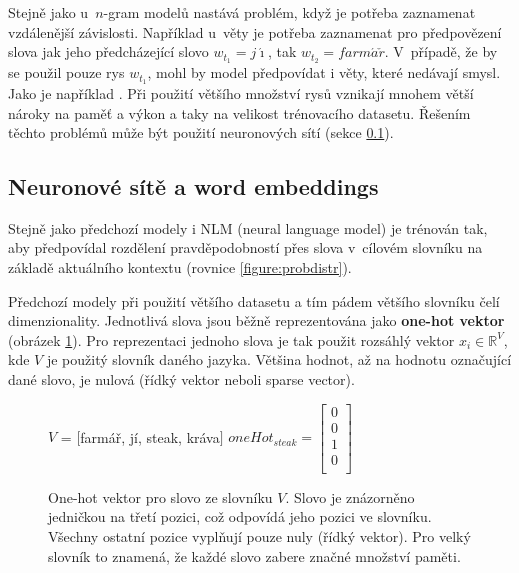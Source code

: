 Stejně jako u~$n$-gram modelů nastává problém, když je potřeba zaznamenat vzdálenější závislosti. Například u~věty  je potřeba zaznamenat pro předpovězení slova  jak jeho předcházející slovo $w_{t_1}=j\acute{\imath}$, tak $w_{t_2}=farm\acute{a}\check{r}$. V~případě, že by se použil pouze rys $w_{t_1}$, mohl by model předpovídat i věty, které nedávají smysl. Jako je například . Při použití většího množství rysů vznikají mnohem větší nároky na paměť a výkon a taky na velikost trénovacího datasetu. Řešením těchto problémů může být použití neuronových sítí (sekce \ref{subsection:neuralembeddings}).


\subsection{Neuronové sítě a word embeddings}\label{subsection:neuralembeddings}
Stejně jako předchozí modely i NLM (neural language model) je trénován tak, aby předpovídal rozdělení pravděpodobností přes slova v~cílovém slovníku na základě aktuálního kontextu (rovnice \ref{figure:probdistr}).

Předchozí modely při použití většího datasetu a tím pádem většího slovníku čelí  dimenzionality. Jednotlivá slova jsou běžně reprezentována jako \textbf{one-hot vektor} (obrázek \ref{figure:oneHot}). Pro reprezentaci jednoho slova je tak použit rozsáhlý vektor $x_i \in \mathbb{R}^{V}$, kde $V$ je použitý slovník daného jazyka. Většina hodnot, až na hodnotu označující dané slovo, je nulová (řídký vektor neboli sparse vector).

\begin{figure}[H]
    \begin{center}
        $V$ = $[$farmář, jí, steak, kráva$]$ \quad
        $
        oneHot_{steak}=
        \begin{bmatrix}
            0 \\
            0 \\
            1 \\
            0 \\
        \end{bmatrix}
        $
    \end{center}
	\caption{One-hot vektor pro slovo  ze slovníku $V$. Slovo je znázorněno jedničkou na třetí pozici, což odpovídá jeho pozici ve slovníku. Všechny ostatní pozice vyplňují pouze nuly (řídký vektor). Pro velký slovník to znamená, že každé slovo zabere značné množství paměti.}
	\label{figure:oneHot}
\end{figure}


